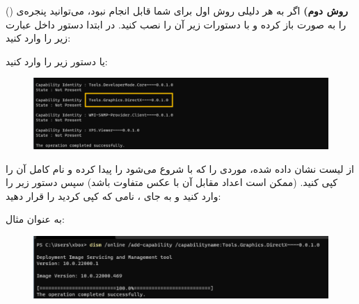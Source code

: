 {\begin{spacing}{1.5}
        \textbf{روش دوم)}
        اگر به هر دلیلی روش اول برای شما قابل انجام نبود، می‌توانید پنجره‌ی  () را به صورت  باز کرده و با دستورات زیر آن را نصب کنید.
        در ابتدا دستور داخل  عبارت زیر را وارد کنید:

        \begin{flushleft}
        \end{flushleft}

        یا دستور زیر را وارد کنید:

        \begin{flushleft}
        \end{flushleft}

        \begin{figure}[H]
            \centering
            \setlength{\belowcaptionskip}{-10pt}
            \includegraphics[width=\textwidth]{Images/3/3.Intro.4.3}
            \caption*{}
        \end{figure}

        از لیست نشان داده شده، موردی را که با  شروع می‌شود را پیدا کرده و نام کامل آن را کپی کنید. (ممکن است اعداد مقابل آن با عکس متفاوت باشد)
        سپس دستور زیر را وارد کنید و به جای ، نامی که کپی کردید را قرار دهید:

        \begin{flushleft}
        \end{flushleft}

        به عنوان مثال:

        \begin{flushleft}
            \normalsize
        \end{flushleft}

        \begin{figure}[H]
            \centering
            \setlength{\belowcaptionskip}{-10pt}
            \includegraphics[width=\textwidth]{Images/3/3.Intro.4.4}
            \caption*{}
        \end{figure}
    \end{spacing}
}
